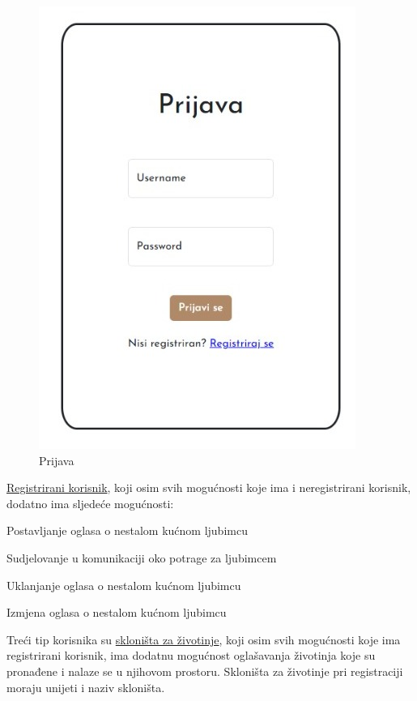 	   \begin{figure}[H]
	   	
	   	\includegraphics[scale =0.4]{prijava.JPEG}
	   	\centering
	   	\caption{Prijava}
	   	\label{fig:your_label}
	   \end{figure}
	   
	   
	     
	    
	    \underline{Registrirani korisnik}, koji osim svih mogućnosti koje ima i neregistrirani korisnik, dodatno ima sljedeće mogućnosti:
	     
		\begin{packed_item}
			\item Postavljanje oglasa o nestalom kućnom ljubimcu 
			\item Sudjelovanje u komunikaciji oko potrage za ljubimcem
			\item Uklanjanje oglasa o nestalom kućnom ljubimcu
			\item Izmjena oglasa o nestalom kućnom ljubimcu
		\end{packed_item}
		Treći tip korisnika su \underline{skloništa za životinje}, koji osim svih mogućnosti koje ima registrirani korisnik, ima dodatnu mogućnost oglašavanja životinja koje su pronađene i nalaze se u njihovom prostoru. Skloništa za životinje pri registraciji moraju unijeti i naziv skloništa.\\
		
